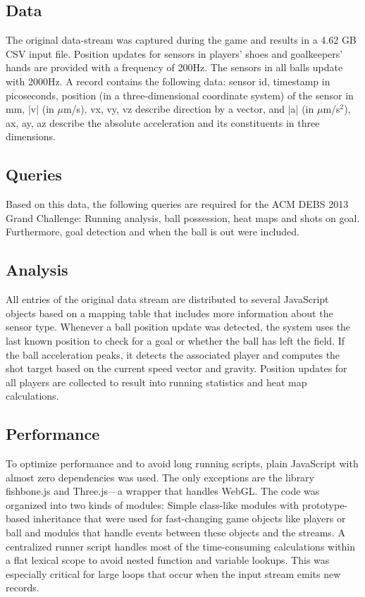\documentclass{sig-alternate}
\begin{document}
\subsection{Data}

The original data-stream was captured during the game
and results in a 4.62 GB CSV input file.
Position updates for sensors in players’ shoes
and goalkeepers’ hands are provided with a frequency of 200Hz.
The sensors in all balls update with 2000Hz.
A record contains the following data:
sensor id, timestamp in picoseconds, position
(in a three-dimensional coordinate system) of the sensor
in mm, |v| (in $\mu$m/s), vx, vy, vz
describe direction by a vector,
and |a| (in $\mu$m/s$^{2}$), ax, ay, az describe the absolute acceleration
and its constituents in three dimensions.

\subsection{Queries}

Based on this data, the following queries are required
for the ACM DEBS 2013 Grand Challenge:
Running analysis, ball possession, heat maps and shots on goal.
Furthermore, goal detection and when the ball is out were included.

\subsection{Analysis}

All entries of the original data stream are distributed
to several JavaScript objects based on a mapping table
that includes more information about the sensor type.
Whenever a ball position update was detected,
the system uses the last known position to check
for a goal or whether the ball has left the field.
If the ball acceleration peaks, it detects the associated player
and computes the shot target
based on the current speed vector and gravity.
Position updates for all players are collected
to result into running statistics and heat map calculations.

\subsection{Performance}

To optimize performance
and to avoid long running scripts,
plain JavaScript with almost zero dependencies was used.
The only exceptions are the library fishbone.js
and Three.js---a wrapper that handles WebGL.
The code was organized into two kinds of modules:
Simple class-like modules with prototype-based inheritance
that were used for fast-changing game objects
like players or ball
and modules that handle events between these objects
and the streams.
A centralized runner script handles
most of the time-consuming calculations within a flat lexical scope
to avoid nested function and variable lookups.
This was especially critical for large loops
that occur when the input stream emits new records.
\end{document}
